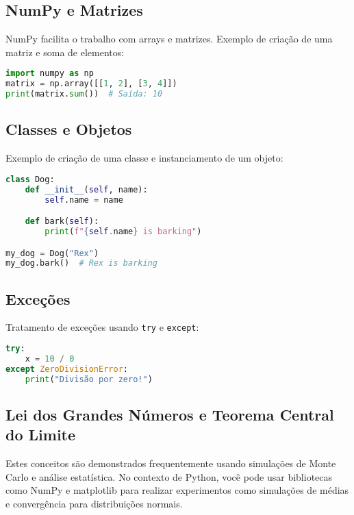 \documentclass{sciposter}
\begin{document}
\begin{multicols}{3}
\subsection{NumPy e Matrizes}
NumPy facilita o trabalho com arrays e matrizes. Exemplo de criação de uma matriz e soma de elementos:
\begin{lstlisting}[language=Python]
import numpy as np
matrix = np.array([[1, 2], [3, 4]])
print(matrix.sum())  # Saída: 10
\end{lstlisting}

\subsection{Classes e Objetos}
Exemplo de criação de uma classe e instanciamento de um objeto:
\begin{lstlisting}[language=Python]
class Dog:
    def __init__(self, name):
        self.name = name

    def bark(self):
        print(f"{self.name} is barking")

my_dog = Dog("Rex")
my_dog.bark()  # Rex is barking
\end{lstlisting}

\subsection{Exceções}
Tratamento de exceções usando \texttt{try} e \texttt{except}:
\begin{lstlisting}[language=Python]
try:
    x = 10 / 0
except ZeroDivisionError:
    print("Divisão por zero!")
\end{lstlisting}

\subsection{Lei dos Grandes Números e Teorema Central do Limite}
Estes conceitos são demonstrados frequentemente usando simulações de Monte Carlo e análise estatística. No contexto de Python, você pode usar bibliotecas como NumPy e matplotlib para realizar experimentos como simulações de médias e convergência para distribuições normais.



\end{multicols}
\end{document}
